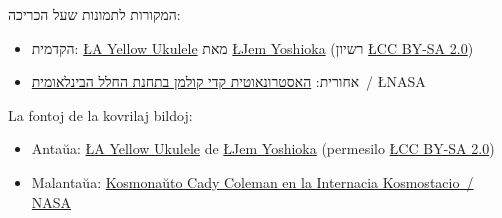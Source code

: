 \dulingvaujo
{
המקורות לתמונות שעל הכריכה:
\begin{itemize}
	\item הקדמית: \href{https://www.flickr.com/photos/jemshed/6423813619/}{\L{A Yellow Ukulele}} מאת \href{https://www.flickr.com/photos/jemshed/}{\L{Jem Yoshioka}} (רשיון \href{https://creativecommons.org/licenses/by-sa/2.0/}{\L{CC BY-SA 2.0}})
	\item אחורית: \href{https://spaceflight.nasa.gov/gallery/images/station/crew-27/html/iss027e005203.html}{האסטרונאוטית קדי קולמן בתחנת החלל הבינלאומית}~/ \L{NASA}
\end{itemize}
}
{
La fontoj de la kovrilaj bildoj:
\begin{itemize}
	\item Antaŭa: \href{https://www.flickr.com/photos/jemshed/6423813619/}{\L{A Yellow Ukulele}} de \href{https://www.flickr.com/photos/jemshed/}{\L{Jem Yoshioka}} (permesilo \href{https://creativecommons.org/licenses/by-sa/2.0/}{\L{CC BY-SA 2.0}})
	\item Malantaŭa: \href{https://spaceflight.nasa.gov/gallery/images/station/crew-27/html/iss027e005203.html}{Kosmonaŭto Cady Coleman en la Internacia Kosmostacio~/ NASA}
\end{itemize}
}
